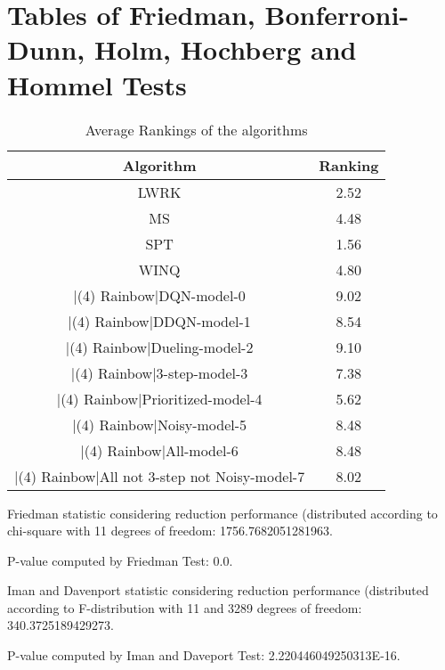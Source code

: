 \documentclass[a3paper,10pt]{article}
\author{}
\date{\today}
\begin{document}
\oddsidemargin 0in \topmargin 0in\maketitle
\section{Tables of Friedman, Bonferroni-Dunn, Holm, Hochberg and Hommel Tests}
\begin{table}[!htp]
\centering
\caption{Average Rankings of the algorithms
}\begin{tabular}{c|c}
Algorithm&Ranking\\
\hline
LWRK&2.52\\
MS&4.48\\
SPT&1.56\\
WINQ&4.80\\
|(4) Rainbow|DQN-model-0&9.02\\
|(4) Rainbow|DDQN-model-1&8.54\\
|(4) Rainbow|Dueling-model-2&9.10\\
|(4) Rainbow|3-step-model-3&7.38\\
|(4) Rainbow|Prioritized-model-4&5.62\\
|(4) Rainbow|Noisy-model-5&8.48\\
|(4) Rainbow|All-model-6&8.48\\
|(4) Rainbow|All not 3-step not Noisy-model-7&8.02\\
\end{tabular}
\end{table}


Friedman statistic considering reduction performance (distributed according to chi-square with 11 degrees of freedom: 1756.7682051281963.


P-value computed by Friedman Test: 0.0.\newline

Iman and Davenport statistic considering reduction performance (distributed according to F-distribution with 11 and 3289 degrees of freedom: 340.3725189429273.


P-value computed by Iman and Daveport Test: 2.220446049250313E-16.\newline
\end{document}
